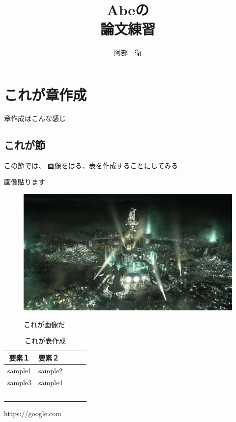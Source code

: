 \documentclass[dvipdfmx]{jsarticle}
\begin{document}
\title{Abeの\\論文練習}
\author{阿部　衛}
\maketitle{\title}
\thispagestyle{empty}
\newpage 


\section{これが章作成}
章作成はこんな感じ
\subsection{これが節}
この節では、
画像をはる、表を作成することにしてみる

画像貼ります
\begin{figure}[h]
   \begin{center}
     \caption{これが画像だ}
     \includegraphics[scale=0.1]{FF7R_zoom.jpg}
　\end{center}
\end{figure}



\begin{table}[h]
 \caption{これが表作成}
 \label{table:SpeedOfLight}
 \centering
  \begin{tabular}{clll}
   \hline
   要素１ & 要素２ \\
   \hline \hline
   sample1 & sample2  \\
   sample3 & sample4　\\    
　\hline
\end{tabular}
\end{table}


\newpage 
\begin{thebibliography}{99}
\item
  https://google.com 
\end{thebibliography}
\end{document}
